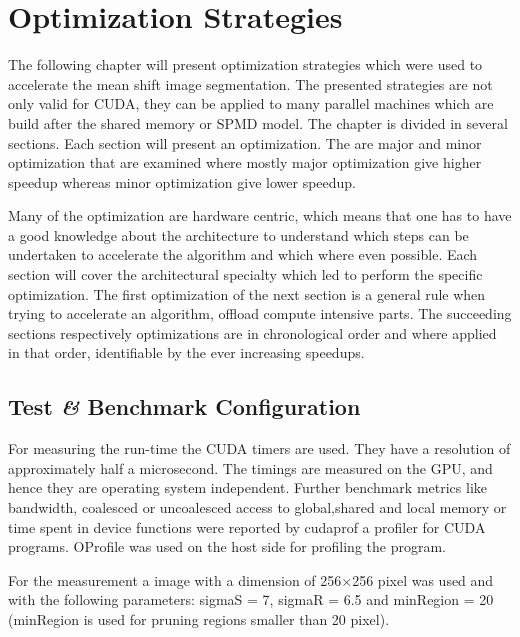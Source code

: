 \chapter{Optimization Strategies}
\label{ch:optimization}

The following chapter will present optimization strategies which were used to
accelerate the mean shift image segmentation. The presented strategies are not
only valid for \gls{CUDA}, they can be applied to many parallel machines which
are build after the shared memory or \gls{SPMD} model. The chapter is divided in
several sections. Each section will present an optimization. The are major and
minor optimization that are examined where mostly major optimization give higher
speedup whereas minor optimization give lower speedup. 

Many of the optimization are hardware centric, which means that one has to have
a good knowledge about the architecture to understand which steps can be
undertaken to accelerate the algorithm and which where even possible. Each
section will cover the architectural specialty which led to perform the specific
optimization. The first optimization of the next section is a general rule when
trying to accelerate an algorithm, offload compute intensive parts. The succeeding
sections respectively optimizations are in chronological order and where applied
in that order, identifiable by the ever increasing speedups. 


\section{Test \textit{\&} Benchmark Configuration} %
\label{sec:test__benchmark_configuration}
For measuring the run-time the \gls{CUDA} timers are used. They have a
resolution of approximately half a microsecond. The timings are measured on the
\gls{GPU}, and hence they are operating system independent. Further benchmark
metrics like bandwidth, coalesced or uncoalesced access to global,shared and
local memory or time spent in device functions were reported by cudaprof a
profiler for \gls{CUDA} programs. OProfile was used on the host side for
profiling the program.

For the measurement a image with a dimension of 256$\times$256 pixel was used
and with the following parameters: \textsf{sigmaS} = 7, \textsf{sigmaR} = 6.5
and \textsf{minRegion} = 20 (\textsf{minRegion} is used for pruning regions
smaller than 20 pixel).


